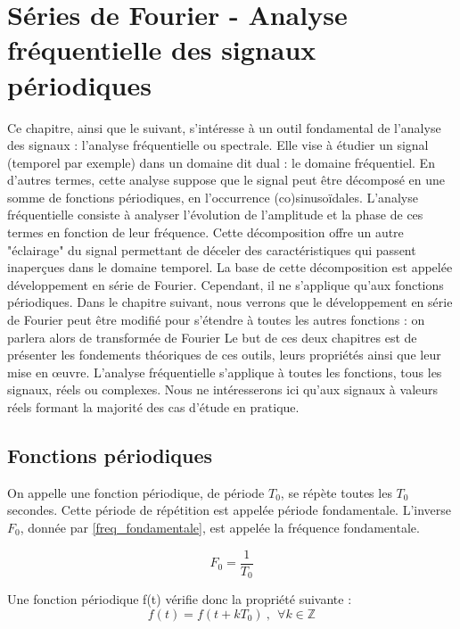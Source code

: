 \chapter{Séries de Fourier - Analyse fréquentielle des signaux périodiques}
\label{chap:series}
	Ce chapitre, ainsi que le suivant, s'intéresse à un outil fondamental de l'analyse des signaux : l'analyse fréquentielle ou spectrale. Elle vise à étudier un signal (temporel par exemple) dans un domaine dit dual : le domaine fréquentiel. En d'autres termes, cette analyse suppose que le signal peut être décomposé en une somme de fonctions périodiques, en l'occurrence (co)sinusoïdales. L'analyse fréquentielle consiste à analyser l'évolution de l'amplitude et la phase de ces termes en fonction de leur fréquence. Cette décomposition offre un autre "éclairage" du signal permettant de déceler des caractéristiques qui passent inaperçues dans le domaine temporel. La base de cette décomposition est appelée développement en série de Fourier. Cependant, il ne s'applique qu'aux fonctions périodiques. Dans le chapitre suivant, nous verrons que le développement en série de Fourier peut être modifié pour s'étendre à toutes les autres fonctions : on parlera alors de transformée de Fourier
	Le but de ces deux chapitres est de présenter les fondements théoriques de ces outils, leurs propriétés ainsi que leur mise en œuvre. L'analyse fréquentielle s'applique à toutes les fonctions, tous les signaux, réels ou complexes. Nous ne intéresserons ici qu'aux signaux à valeurs réels formant la majorité des cas d'étude en pratique.
	
	\section{Fonctions périodiques}
	On appelle une fonction périodique, de période $T_{0}$, se répète toutes les $T_{0}$ secondes. Cette période de répétition est appelée période fondamentale. L'inverse $F_{0}$, donnée par \ref{freq_fondamentale}, est appelée la fréquence fondamentale.
	
	\begin{equation}\label{freq_fondamentale}
	F_{0}=\frac{1}{T_{0}}
	\end{equation}
	
	Une fonction périodique f(t) vérifie donc la propriété suivante :
	\begin{equation}\label{Fonction_periodique}
	f(t)=f(t+kT_{0})~,~~\forall k\in \mathbb{Z}
	\end{equation}
	
